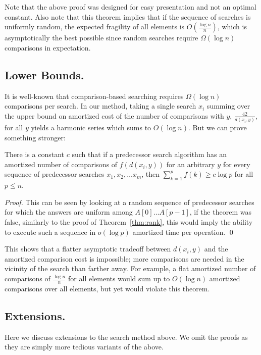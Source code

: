 Note that the above proof was designed for easy presentation and not an optimal constant. Also note that this theorem implies that if the sequence of searches is uniformly random, the expected fragility of all elements is $O(\frac{\log n}{n})$, which is asymptotically the best possible since random searches require $\Omega(\log n)$ comparisons in expectation.

\subsection{Lower Bounds.} It is well-known that comparison-based searching requires $\Omega(\log n)$ comparisons per search. In our method, taking a single search $x_i$ summing over the upper bound on amortized cost of the number of comparisons with $y$, $\frac{42}{d(x_i,y)}$, for all $y$ yields a harmonic series which sums to $O(\log n)$. But we can prove something stronger:

\begin{theorem} \label{t:lb}
There is a constant $c$ such that if a predecessor search algorithm has an amortized number of comparisons of $f(d(x_i,y))$ for an arbitrary $y$ for every sequence of predecessor searches $x_1, x_2, \ldots x_m$, then $\sum_{k=1}^p f(k) \geq c \log p$ for all $p \leq n$.
\end{theorem}

\begin{proof}
This can be seen by looking at a random sequence of predecessor searches for which the answers are uniform among $A[0]\ldots A[p-1]$, if the theorem was false, similarly to the proof of Theorem~\ref{thm:rank}, this would imply the ability to execute such a sequence in $o(\log p)$ amortized time per operation. \qed
\end{proof}

This shows that a flatter asymptotic tradeoff between $d(x_i,y)$ and the amortized comparison cost is impossible; more comparisons are needed in the vicinity of the search than farther away.
For example, a flat amortized number of comparisons of $\frac{\log n}{n}$ for all elements would sum up to $O(\log n)$ amortized comparisons over all elements, but yet would violate this theorem. 

\subsection{Extensions.}

Here we discuss extensions to the search method above. We omit the proofs as they are simply more tedious variants of the above.

